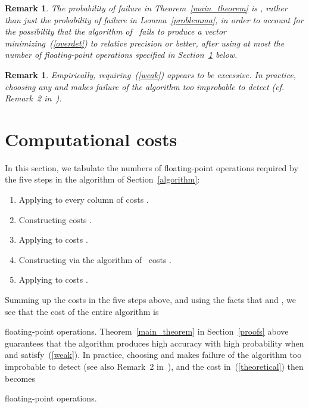 \documentclass[letterpaper,12pt]{article}
\newtheorem{remark1}[theorem]{Remark}
\newenvironment{remark}{\begin{remark1} \rm}{\end{remark1}}
\begin{document}
\begin{remark}
The probability of failure in Theorem~\ref{main_theorem} is ,
rather than just the probability  of failure
in Lemma~\ref{problemma}, in order to account for the possibility that
the algorithm of~\cite{rokhlin-tygert} fails to produce a vector
 minimizing~(\ref{overdet}) to relative precision
 or better,
after using at most the number of floating-point operations
specified in Section~\ref{costs} below.
\end{remark}


\begin{remark}
Empirically, requiring~(\ref{weak}) appears to be excessive.
In practice, choosing any  and  makes failure
of the algorithm too improbable to detect
({\it cf.} Remark~2 in~\cite{rokhlin-tygert}).
\end{remark}



\section{Computational costs}
\label{costs}

In this section, we tabulate the numbers of floating-point operations
required by the five steps in the algorithm of Section~\ref{algorithm}:

\begin{enumerate}
\item Applying  to every column of 
      costs .
\item Constructing  costs .
\item Applying  to 
      costs .
\item Constructing  via the algorithm of~\cite{rokhlin-tygert}
      costs .
\item Applying  to  costs .
\end{enumerate}

Summing up the costs in the five steps above,
and using the facts that  and ,
we see that the cost of the entire algorithm is

floating-point operations.
Theorem~\ref{main_theorem} in Section~\ref{proofs} above
guarantees that the algorithm produces
high accuracy with high probability when  and  satisfy~(\ref{weak}).
In practice, choosing  and  makes failure
of the algorithm too improbable to detect
(see also Remark~2 in~\cite{rokhlin-tygert}),
and the cost in~(\ref{theoretical}) then becomes

floating-point operations.
\end{document}
